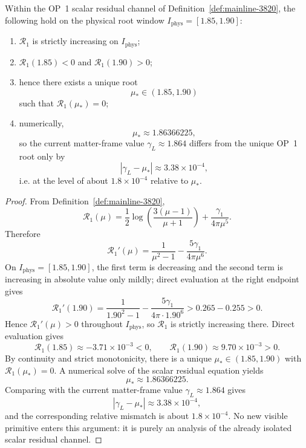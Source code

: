 \begin{theorem}
\label{thm:mainline-3830}
Within the OP~1 scalar residual channel of Definition~\ref{def:mainline-3820}, the following hold on the physical root window \(I_{\mathrm{phys}}=[1.85,1.90]\):
\begin{enumerate}[label=(\roman*), leftmargin=2em]
  \item \(\mathcal R_1\) is strictly increasing on \(I_{\mathrm{phys}}\);
  \item \(\mathcal R_1(1.85)<0\) and \(\mathcal R_1(1.90)>0\);
  \item hence there exists a unique root
  \[
    \mu_\ast\in(1.85,1.90)
  \]
  such that \(\mathcal R_1(\mu_\ast)=0\);
  \item numerically,
  \[
    \mu_\ast \approx 1.86366225,
  \]
  so the current matter-frame value \(\gamma_L\approx 1.864\) differs from the unique OP~1 root only by
  \[
    |\gamma_L-\mu_\ast|\approx 3.38\times 10^{-4},
  \]
  i.e. at the level of about \(1.8\times 10^{-4}\) relative to \(\mu_\ast\).
\end{enumerate}
\end{theorem}

\begin{proof}
From Definition~\ref{def:mainline-3820},
\[
  \mathcal R_1(\mu)=\frac12\log\!\left(\frac{3(\mu-1)}{\mu+1}\right)+\frac{\gamma_1}{4\pi\mu^5}.
\]
Therefore
\[
  \mathcal R_1'(\mu)
  =\frac{1}{\mu^2-1}-\frac{5\gamma_1}{4\pi\mu^6}.
\]
On \(I_{\mathrm{phys}}=[1.85,1.90]\), the first term is decreasing and the second term is increasing in absolute value only mildly; direct evaluation at the right endpoint gives
\[
  \mathcal R_1'(1.90)
  =
  \frac{1}{1.90^2-1}-\frac{5\gamma_1}{4\pi\cdot 1.90^6}
  > 0.265-0.255
  > 0.
\]
Hence \(\mathcal R_1'(\mu)>0\) throughout \(I_{\mathrm{phys}}\), so \(\mathcal R_1\) is strictly increasing there. Direct evaluation gives
\[
  \mathcal R_1(1.85)\approx -3.71\times 10^{-3}<0,
  \qquad
  \mathcal R_1(1.90)\approx 9.70\times 10^{-3}>0.
\]
By continuity and strict monotonicity, there is a unique \(\mu_\ast\in(1.85,1.90)\) with \(\mathcal R_1(\mu_\ast)=0\). A numerical solve of the scalar residual equation yields
\[
  \mu_\ast\approx 1.86366225.
\]
Comparing with the current matter-frame value \(\gamma_L\approx 1.864\) gives
\[
  |\gamma_L-\mu_\ast|\approx 3.38\times 10^{-4},
\]
and the corresponding relative mismatch is about \(1.8\times 10^{-4}\). No new visible primitive enters this argument: it is purely an analysis of the already isolated scalar residual channel.
\end{proof}

